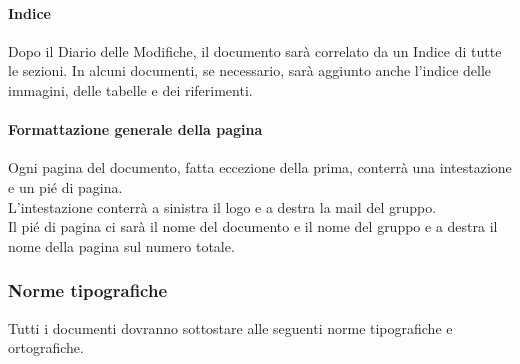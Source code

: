 \paragraph{Indice}
Dopo il Diario delle Modifiche, il documento sarà correlato da un Indice di tutte le sezioni. In alcuni documenti, se necessario, sarà aggiunto anche l'indice delle immagini, delle tabelle e dei riferimenti.
\paragraph{Formattazione generale della pagina}
Ogni pagina del documento, fatta eccezione della prima, conterrà una intestazione e un pié di pagina.
\\L'intestazione conterrà a sinistra il logo e a destra la mail del gruppo.
\\Il pié di pagina ci sarà il nome del documento e il nome del gruppo e a destra il nome della pagina sul numero totale.
\subsubsection{Norme tipografiche}
Tutti i documenti dovranno sottostare alle seguenti norme tipografiche e ortografiche.
